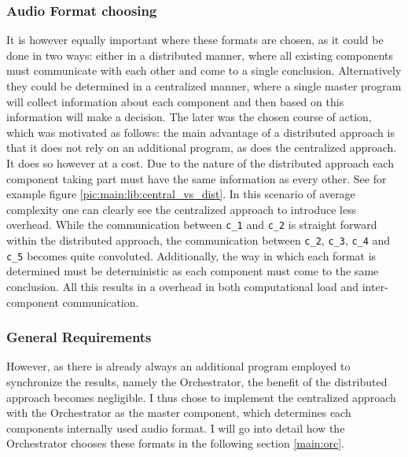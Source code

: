 \subsubsection{Audio Format choosing}
\label{main:lib:format_chooosing}
It is however equally important where these formats are chosen, as it could be done in two ways:
either in a distributed manner, where all existing components must communicate with each other and come to a single conclusion.
Alternatively they could be determined in a centralized manner, where a single master program will collect information about each component and then based on this information will make a decision.
The later was the chosen course of action, which was motivated as follows:
the main advantage of a distributed approach is that it does not rely on an additional program, as does the centralized approach.
It does so however at a cost. 
Due to the nature of the distributed approach each component taking part must have the same information as every other.
See for example figure \ref{pic:main:lib:central_vs_dist}.
In this scenario of average complexity one can clearly see the centralized approach to introduce less overhead.
While the communication between \texttt{c\_1} and \texttt{c\_2} is straight forward within the distributed approach, the communication between \texttt{c\_2}, \texttt{c\_3}, \texttt{c\_4} and \texttt{c\_5} becomes quite convoluted.
Additionally, the way in which each format is determined must be deterministic as each component must come to the same conclusion.
All this results in a overhead in both computational load and inter-component communication.

\subsubsection{General Requirements}
However, as there is already always an additional program  employed to synchronize the results, namely the Orchestrator, the benefit of the distributed approach becomes negligible.
I thus chose to implement the centralized approach with the Orchestrator as the master component, which determines each components internally used audio format.
I will go into detail how the Orchestrator chooses these formats in the following section \ref{main:orc}.

